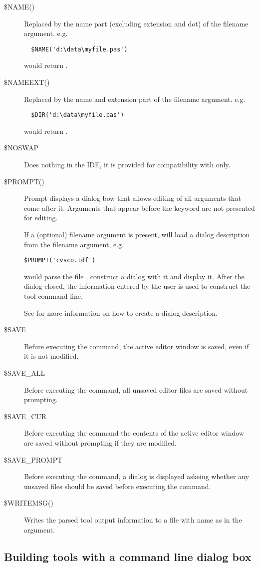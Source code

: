 \begin{description}
\item[\$NAME()]
Replaced by the name part (excluding extension and dot) of the filename
argument.
e.g.
\begin{verbatim}
  $NAME('d:\data\myfile.pas')
\end{verbatim}
would return .
\item[\$NAMEEXT()]
Replaced by the name and extension part of the filename argument.
e.g.
\begin{verbatim}
  $DIR('d:\data\myfile.pas')
\end{verbatim}
would return .
\item[\$NOSWAP]
Does nothing in the IDE, it is provided for compatibility with \tp only.
\item[\$PROMPT()]
Prompt displays a dialog bow that allows editing of all arguments that
come after it. Arguments that appear before the  keyword
are not presented for editing.

If a (optional) filename argument is present,  will load
a dialog description from the filename argument, e.g.
\begin{verbatim}
$PROMPT('cvsco.tdf')
\end{verbatim}
would parse the file , construct a dialog with it and
display it. After the dialog closed, the information entered by the user
is used to construct the tool command line.

See  for more information on how to create a dialog
description.
\item[\$SAVE]
Befure executing the command, the active editor window is saved, even if it is not modified.
\item[\$SAVE\_ALL]
Before executing the command, all unsaved editor files are saved without prompting.
\item[\$SAVE\_CUR]
Before executing the command the contents of the active editor window are
saved without prompting if they are modified.
\item[\$SAVE\_PROMPT]
Before executing the command, a dialog is displayed askeing whether any
unsaved files should be saved before executing the command.
\item[\$WRITEMSG()]
Writes the parsed tool output information to a file with name as in the argument.
\end{description}	

\subsection{Building tools with a command line dialog box}
\label{se:commanddialogs}


